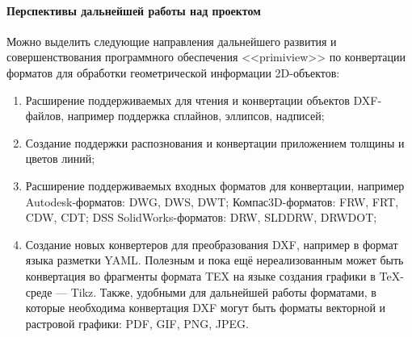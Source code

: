 \paragraph{Перспективы дальнейшей работы над проектом} 
\nopagebreak

Можно выделить следующие направления дальнейшего развития и совершенствования программного обеспечения <<primiview>> по конвертации форматов для обработки геометрической информации 2D-объектов:

\begin{enumerate}[1)]
	\item Расширение поддерживаемых для чтения и конвертации объектов DXF-файлов, например поддержка сплайнов, эллипсов, надписей;
	\item Создание поддержки распознования и конвертации приложением толщины и цветов линий;
	\item Расширение поддерживаемых входных форматов для конвертации, например Autodesk-форматов: DWG, DWS, DWT; Компас3D-форматов: FRW, FRT, CDW, CDT; DSS SolidWorks-форматов: DRW, SLDDRW, DRWDOT;
	\item Создание новых конвертеров для преобразования DXF, например в формат языка разметки YAML. Полезным и пока ещё нереализованным может быть конвертация во фрагменты формата TEX на языке создания графики в \TeX-среде --- Tikz. Также, удобными для дальнейшей работы форматами, в которые необходима конвертация DXF могут быть форматы векторной и растровой графики: PDF, GIF, PNG, JPEG.
\end{enumerate}


